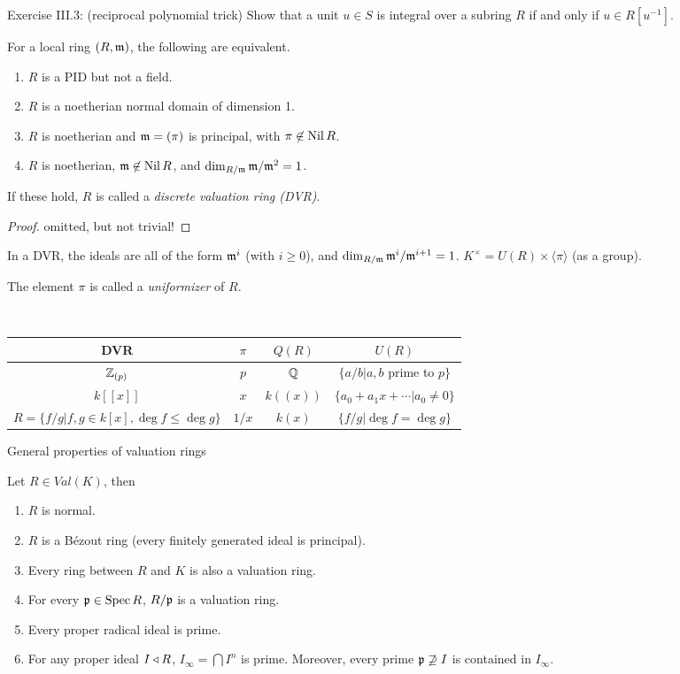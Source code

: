  \setcounter{lecture}{30}

Exercise III.3: (reciprocal polynomial trick) Show that a unit $u\in S$ is integral over
a subring $R$ if and only if $u\in R[u^{-1}]$.

\begin{theorem}
  For a local ring $(R,\mathfrak{m})$, the following are equivalent.
  \begin{enumerate}
    \item $R$ is a PID but not a field.
    \item $R$ is a noetherian normal domain of dimension 1.
    \item $R$ is noetherian and $\mathfrak{m} = (\pi)$ is principal, with $\pi\not\in \operatorname{Nil} R$.
    \item $R$ is noetherian, $\mathfrak{m}\not\in \operatorname{Nil} R$, and $\dim_{R/\mathfrak{m}} \mathfrak{m}/\mathfrak{m}^2=1$.
  \end{enumerate}
  If these hold, $R$ is called a \emph{discrete valuation ring (DVR)}.
\end{theorem}
\begin{proof}
  omitted, but not trivial! \anton{}
\end{proof}
\begin{remark}
  In a DVR, the ideals are all of the form $\mathfrak{m}^i$ (with $i\ge 0$), and $\dim_{R/\mathfrak{m}}
  \mathfrak{m}^i/\mathfrak{m}^{i+1}=1$. $K^\times = U(R)\times \langle \pi\rangle$ (as a group).
\end{remark}
\begin{definition}
  The element $\pi$ is called a \emph{uniformizer} of $R$.
\end{definition}
\begin{example}\\
  \begin{tabular}{c|c|c|c}
    DVR & $\pi$ & $Q(R)$ & $U(R)$\\ \hline
    $\mathbb{Z}_{(p)}$ & $p$ & $\mathbb{Q}$ & $\{a/b| a,b$ prime to $p\}$\\
    $k[[x]]$ & $x$ & $k((x))$ & $\{a_0+a_1x+\cdots|a_0\neq 0\}$\\
    $R=\{f/g| f,g\in k[x], \deg f\le \deg g\}$ & $1/x$ & $k(x)$ & $\{f/g|\deg f=\deg g\}$
  \end{tabular}
\end{example}
General properties of valuation rings
\begin{theorem}
  Let $R\in Val(K)$, then
  \begin{enumerate}
    \item $R$ is normal.
    \item $R$ is a B\'ezout ring (every finitely generated ideal is principal).
    \item Every ring between $R$ and $K$ is also a valuation ring.
    \item For every $\mathfrak{p}\in \operatorname{Spec} R$, $R/\mathfrak{p}$ is a valuation ring.
    \item Every proper radical ideal is prime.
    \item For any proper ideal $I\triangleleft R$, $I_\infty = \bigcap I^n$ is prime. Moreover,
    every prime $\mathfrak{p}\not\supseteq I$ is contained in $I_\infty$.
  \end{enumerate}
\end{theorem}
